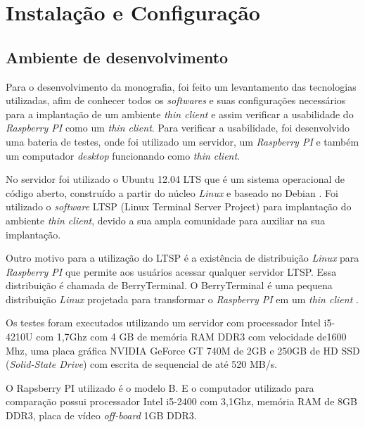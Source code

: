 \documentclass[
	12pt,				%
	openright,			%
	twoside,			%
	a4paper,			%
	chapter=TITLE,		%
	english,			%
	brazil				%
	]{abntex2}
\begin{document}


\part{Instalação e Configuração}

\chapter{Ambiente de desenvolvimento}
\label{AmbienteTest}
Para o desenvolvimento da monografia, foi feito um levantamento das tecnologias utilizadas, afim de conhecer todos os \textit{softwares} e suas configurações necessários para a implantação de um ambiente \textit{thin client} e assim verificar a usabilidade do \textit{Raspberry PI} como um \textit{thin client}. Para verificar a usabilidade, foi desenvolvido uma bateria de testes, onde foi utilizado um servidor, um \textit{Raspberry PI} e também um computador \textit{desktop} funcionando como \textit{thin client}. 

No servidor foi utilizado o Ubuntu 12.04 LTS que é um sistema operacional de código aberto, construído a partir do núcleo \textit{Linux} e baseado no Debian \cite{ubuntu}. Foi utilizado o \textit{software} LTSP (Linux Terminal Server Project) para implantação do ambiente \textit{thin client}, devido a sua ampla comunidade para auxiliar na sua implantação. 

Outro motivo para a utilização do LTSP é a existência de distribuição \textit{Linux} para \textit{Raspberry PI} que permite aos usuários acessar qualquer servidor LTSP. Essa distribuição é chamada de BerryTerminal. O BerryTerminal é uma pequena distribuição \textit{Linux} projetada para transformar o \textit{Raspberry PI} em um \textit{thin client} \cite{berryterminal}.

Os testes foram executados utilizando um servidor com processador Intel i5-4210U com 1,7Ghz com 4 GB de memória RAM DDR3 com velocidade de1600 Mhz, uma placa gráfica NVIDIA GeForce GT 740M de 2GB e 250GB de HD SSD (\textit{Solid-State Drive}) com escrita de sequencial de até 520 MB/s.
	
O Rapsberry PI utilizado é o modelo B. E o computador utilizado para comparação possui processador Intel i5-2400 com 3,1Ghz, memória RAM de 8GB DDR3, placa de vídeo \textit{off-board} 1GB DDR3.
\end{document}
